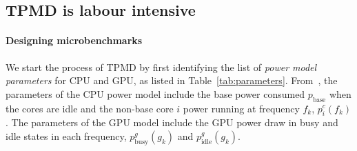 \subsection{TPMD is labour intensive}

\paragraph{Designing microbenchmarks} 
We start the process of TPMD by first identifying the list of {\it power model parameters}
for CPU and GPU, as listed in Table~\ref{tab:parameters}.
From~\cite{multicoremodel:2015}, the parameters of the CPU power model include
the base power consumed $p_{\text{base}}$ when the cores are idle and
the non-base core $i$ power running at frequency $f_k$, $p^c_i(f_k)$.
% 
The parameters of the GPU model include the GPU power draw in 
busy and idle states in each frequency, $p^g_{\text{busy}}(g_k)$ and 
$p^g_{\text{idle}}(g_k)$.

